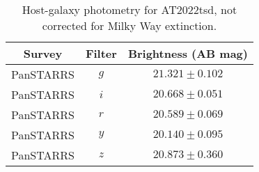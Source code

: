 \documentclass{nature_plusfigure}
\newcommand{\at}{AT2022tsd}
\begin{document}
\begin{extended_data}
\begin{table}
\begin{center}
\caption{Host-galaxy photometry for \at, not corrected for Milky Way extinction.}
\label{tab:host-photometry}
\begin{tabular}{ccc} 
\hline\hline
Survey & Filter & Brightness (AB mag) \\
\hline
PanSTARRS & $g$               &$ 21.321 \pm 0.102 $\\
PanSTARRS & $i$               &$ 20.668 \pm 0.051 $\\
PanSTARRS & $r$               &$ 20.589 \pm 0.069 $\\
PanSTARRS & $y$               &$ 20.140 \pm 0.095 $\\
PanSTARRS& $z$               &$ 20.873 \pm 0.360 $\\
\hline
\end{tabular}
\end{center}
\end{table}


\end{extended_data}

\clearpage
\end{document}
